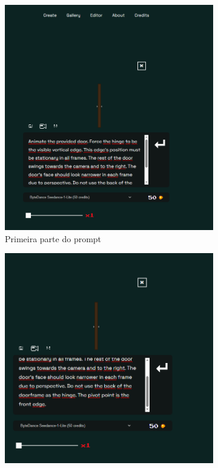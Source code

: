 \begin{figure}[htbp]
    \centering
    \caption{\small Segundo prompt utilizado no Pixie.Haus}
    \label{fig:pixieHausPrompt2}
    \begin{subfigure}{0.45\linewidth}
        \includegraphics[width=1\linewidth]{figs/pixieHaus/tela3.PNG}
        \caption{\small Primeira parte do prompt}
        \label{fig:pixieHausPrompt2a}
    \end{subfigure}
    \begin{subfigure}{0.45\linewidth}
        \includegraphics[width=1\linewidth]{figs/pixieHaus/tela4.PNG}

\end{subfigure}
\end{figure}
